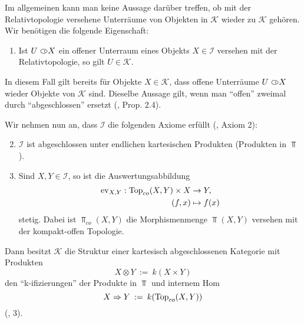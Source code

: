 Im allgemeinen kann man keine Aussage darüber treffen, ob mit der
Relativtopologie versehene Unterräume von Objekten in $\mathcal{K}$
wieder zu $\mathcal{K}$ gehören. Wir benötigen die folgende
Eigenschaft:
\begin{enumerate}
\item \label{itm:k-axiom-subspace} Ist $U \subset\kern-0.58em\circ X$ ein offener
  Unterraum eines Objekts $X \in \mathcal{I}$ versehen mit der
  Relativtopologie, so gilt $U \in \mathcal{K}$.
\end{enumerate}
In diesem Fall gilt bereits für Objekte $X \in \mathcal{K}$, dass
offene Unterräume $U \subset\kern-0.58em\circ X$ wieder Objekte von $\mathcal{K}$
sind. Dieselbe Aussage gilt, wenn man ``offen'' zweimal durch
``abgeschlossen'' ersetzt (\cite{Vogt}, Prop. 2.4).

Wir nehmen nun an, dass $\mathcal{I}$ die folgenden Axiome erfüllt
(\cite{Vogt}, Axiom 2):
\begin{enumerate}
  \setcounter{enumi}{1}
  \item \label{itm:k-axiom-prod} $\mathcal{I}$ ist abgeschlossen unter
    endlichen kartesischen Produkten (Produkten in $\Top$).
  \item \label{itm:k-axiom-ev} Sind $X, Y \in \mathcal{I}$, so ist die
    Auswertungsabbildung
    \begin{align*}
      \operatorname{ev}_{X, Y}: \operatorname{Top}_{co}(X, Y) \times X &\to Y, \\
      (f, x) &\mapsto f(x)
    \end{align*}
    stetig. Dabei ist $\Top_{co}(X, Y)$ die Morphismenmenge $\Top(X,
    Y)$ versehen mit der kompakt-offen Topologie.
\end{enumerate}
Dann besitzt $\mathcal{K}$ die Struktur einer kartesisch
abgeschlossenen Kategorie mit Produkten
\[ X \otimes Y \: := \: k(X \times Y) \]
den ``k-ifizierungen'' der Produkte in $\Top$ und internem Hom
\[ X \Rightarrow Y \: := \: k(\operatorname{Top}_{co}(X, Y)) \] 
(\cite{Vogt}, 3).

